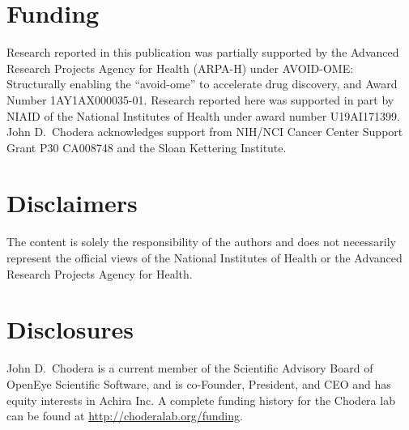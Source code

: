 \documentclass[journal=jcim,manuscript=article]{achemso}
\begin{document}
\section{Funding}

Research reported in this publication was partially supported by the Advanced Research Projects Agency for Health (ARPA-H) under AVOID-OME: Structurally enabling the “avoid-ome” to accelerate drug discovery, and Award Number 1AY1AX000035-01. 
Research reported here was supported in part by NIAID of the National Institutes of Health under award number U19AI171399.
John D.\ Chodera acknowledges support from NIH/NCI Cancer Center Support Grant P30 CA008748 and the Sloan Kettering Institute.

\section{Disclaimers}
The content is solely the responsibility of the authors and does not necessarily represent the official views of the National Institutes of Health or the Advanced Research Projects Agency for Health.

\section{Disclosures}
John D.\ Chodera is a current member of the Scientific Advisory Board of OpenEye Scientific Software, and is co-Founder, President, and CEO and has equity interests in Achira Inc.
A complete funding history for the Chodera lab can be found at \url{http://choderalab.org/funding}.






\end{document}
